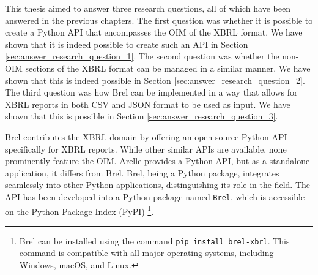 This thesis aimed to answer three research questions, all of which have been answered in the previous chapters.
The first question was whether it is possible to create a Python API that encompasses the OIM of the XBRL format.
We have shown that it is indeed possible to create such an API in Section \ref{sec:answer_research_question_1}.
The second question was whether the non-OIM sections of the XBRL format can be managed in a similar manner.
We have shown that this is indeed possible in Section \ref{sec:answer_research_question_2}.
The third question was how Brel can be implemented in a way that allows for XBRL reports in both CSV and JSON format to be used as input.
We have shown that this is possible in Section \ref{sec:answer_research_question_3}.

Brel contributes the XBRL domain by offering an open-source Python API specifically for XBRL reports.
While other similar APIs are available, none prominently feature the OIM.
Arelle provides a Python API, but as a standalone application, it differs from Brel.
Brel, being a Python package, integrates seamlessly into other Python applications, distinguishing its role in the field.
The API has been developed into a Python package named \texttt{Brel},
which is accessible on the Python Package Index (PyPI)
\footnote{Brel can be installed using the command \texttt{pip install brel-xbrl}. This command is compatible with all major operating systems, including Windows, macOS, and Linux.}.

